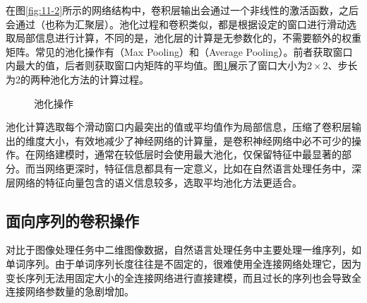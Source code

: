 \parinterval 在图\ref{fig:11-2}所示的网络结构中，卷积层输出会通过一个非线性的激活函数，之后会通过{\small{}}（也称为汇聚层）。池化过程和卷积类似，都是根据设定的窗口进行滑动选取局部信息进行计算，不同的是，池化层的计算是无参数化的，不需要额外的权重矩阵。常见的池化操作有{\small{}}（Max Pooling）和{\small{}}（Average Pooling）。前者获取窗口内最大的值，后者则获取窗口内矩阵的平均值。图\ref{fig:11-8}展示了窗口大小为$2 \times 2$、步长为2的两种池化方法的计算过程。

\begin{figure}[htp]
\centering
%
\caption{池化操作}
\label{fig:11-8}
\end{figure}

\parinterval 池化计算选取每个滑动窗口内最突出的值或平均值作为局部信息，压缩了卷积层输出的维度大小，有效地减少了神经网络的计算量，是卷积神经网络中必不可少的操作。在网络建模时，通常在较低层时会使用最大池化，仅保留特征中最显著的部分。而当网络更深时，特征信息都具有一定意义，比如在自然语言处理任务中，深层网络的特征向量包含的语义信息较多，选取平均池化方法更适合。



\subsection{面向序列的卷积操作}

\parinterval 对比于图像处理任务中二维图像数据，自然语言处理任务中主要处理一维序列，如单词序列。由于单词序列长度往往是不固定的，很难使用全连接网络处理它，因为变长序列无法用固定大小的全连接网络进行直接建模，而且过长的序列也会导致全连接网络参数量的急剧增加。

